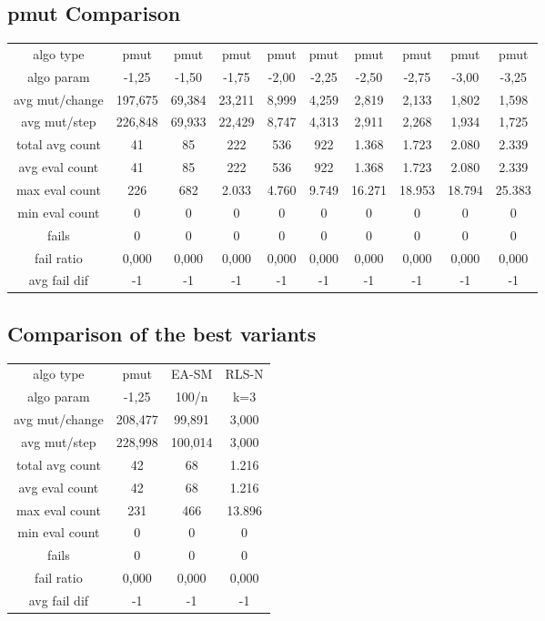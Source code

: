 \subsection{pmut Comparison}

\begin{tabular}[h]{cccccccccc}
algo type&           pmut&    pmut&    pmut&    pmut&    pmut&    pmut&    pmut&    pmut&    pmut\\
algo param&         -1,25&   -1,50&   -1,75&   -2,00&   -2,25&   -2,50&   -2,75&   -3,00&   -3,25\\
avg mut/change&   197,675&  69,384&  23,211&   8,999&   4,259&   2,819&   2,133&   1,802&   1,598\\
avg mut/step&     226,848&  69,933&  22,429&   8,747&   4,313&   2,911&   2,268&   1,934&   1,725\\
\hline
total avg count&       41&      85&     222&     536&     922&   1.368&   1.723&   2.080&   2.339\\
avg eval count&        41&      85&     222&     536&     922&   1.368&   1.723&   2.080&   2.339\\
max eval count&       226&     682&   2.033&   4.760&   9.749&  16.271&  18.953&  18.794&  25.383\\
min eval count&         0&       0&       0&       0&       0&       0&       0&       0&       0\\
\hline
fails&                  0&       0&       0&       0&       0&       0&       0&       0&       0\\
fail ratio&         0,000&   0,000&   0,000&   0,000&   0,000&   0,000&   0,000&   0,000&   0,000\\
avg fail dif&          -1&      -1&      -1&      -1&      -1&      -1&      -1&      -1&      -1\\
\end{tabular}

\subsection{Comparison of the best variants}

\begin{tabular}[h]{cccc}
algo type&           pmut&   EA-SM&   RLS-N\\
algo param&         -1,25&   100/n&     k=3\\
avg mut/change&   208,477&  99,891&   3,000\\
avg mut/step&     228,998& 100,014&   3,000\\
\hline
total avg count&       42&      68&   1.216\\
avg eval count&        42&      68&   1.216\\
max eval count&       231&     466&  13.896\\
min eval count&         0&       0&       0\\
\hline
fails&                  0&       0&       0\\
fail ratio&         0,000&   0,000&   0,000\\
avg fail dif&          -1&      -1&      -1\\
\end{tabular}

